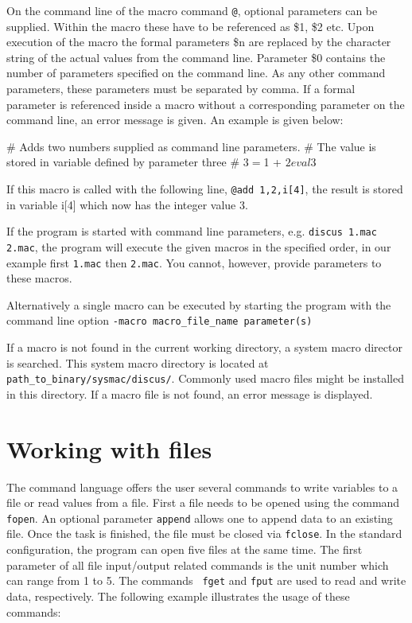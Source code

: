 On the command line of the macro command {\tt @}, optional
parameters can be supplied.  Within the macro these have to be
referenced as \$1, \$2 etc.  Upon execution of the macro the formal
parameters \$n are replaced by the character string of the actual
values from the command line. Parameter \$0 contains the number of
parameters specified on the command line. As any other command
parameters, these parameters must be separated by comma.  If a
formal parameter is referenced inside a macro without a
corresponding parameter on the command line, an error message is
given.  An example is given below:

\begin{MacVerbatim}
     # Adds two numbers supplied as command line parameters.
     # The value is stored in variable defined by parameter three
     #
     $3 = $1 + $2
     eval $3
\end{MacVerbatim}

If this macro is called with the following line, {\tt @add
1,2,i[4]}, the result is stored in variable i[4] which now has the
integer value 3.
\par

If the program is started with command line parameters,
e.g. {\tt discus 1.mac 2.mac}, the program will execute the given
macros in the specified order, in our example first {\tt 1.mac} then
{\tt 2.mac}. You cannot, however, provide parameters to these macros.

Alternatively a single macro can be executed by starting the program
with the command line option 
{\tt -macro macro\_file\_name parameter(s)}

If a macro is not found in the current working
directory, a system macro director is searched. This system macro
directory is located at {\tt path\_to\_binary/sysmac/discus/}.
Commonly used macro files might be installed in this directory.
If a macro file is not found, an error message is displayed.


\section{Working with files \label{io}}

The command language offers the user several commands to write
variables to a file or read values from a file. First a file needs
to be opened using the command {\tt fopen}. An optional parameter
{\tt append} allows one to append data to an existing file. Once the
task is finished, the file must be closed via {\tt fclose}. In the
standard configuration, the program can open five files at the same
time. The first parameter of all file input/output related commands
is the unit number which can range from 1 to 5. The commands {\tt
fget} and {\tt fput} are used to read and write data, respectively.
The following example illustrates the usage of these commands:

